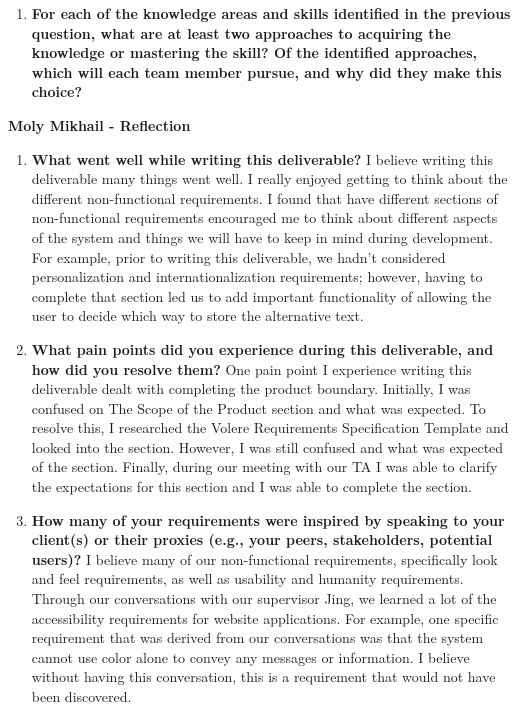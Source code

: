 \begin{enumerate}
  \item \textbf{For each of the knowledge areas and skills identified in the previous
  question, what are at least two approaches to acquiring the knowledge or
  mastering the skill?  Of the identified approaches, which will each team
  member pursue, and why did they make this choice?}\newline

\end{enumerate}


\textbf{Moly Mikhail  - Reflection}
\begin{enumerate}
  \item \textbf{What went well while writing this deliverable?} \newline
  I believe writing this deliverable many things went well. I really enjoyed getting to think about the different
  non-functional requirements. I found that have different sections of non-functional requirements encouraged me to think about different 
  aspects of the system and things we will have to keep in mind during development. For example, prior to writing 
  this deliverable, we hadn’t considered personalization and internationalization requirements; however, having to
  complete that section led us to add important functionality of allowing the user to decide which way
  to store the alternative text. 
  
\item \textbf{What pain points did you experience during this
    deliverable, and how did you resolve them?} \newline
  One pain point I experience writing this deliverable dealt with completing the product boundary. 
  Initially, I was confused on The Scope of the Product section and what was expected. 
  To resolve this, I researched the Volere Requirements Specification Template and looked into the section. 
  However, I was still confused and what was expected of the section. Finally, during our meeting with
  our TA I was able to clarify the expectations for this section and I was able to complete the section. 
 
   \item \textbf{How many of your requirements were inspired by
      speaking to your client(s) or their proxies (e.g., your peers,
    stakeholders, potential users)?} \newline
  I believe many of our non-functional requirements, specifically look and feel 
  requirements, as well as usability and humanity requirements. Through our
  conversations with our supervisor Jing, we learned a lot of the accessibility
  requirements for website applications. For example, one specific requirement 
  that was derived from our conversations was that the system cannot use color alone to convey any messages
  or information. I believe without having this conversation, this is a requirement that would not have been discovered. 
 

\end{enumerate}
